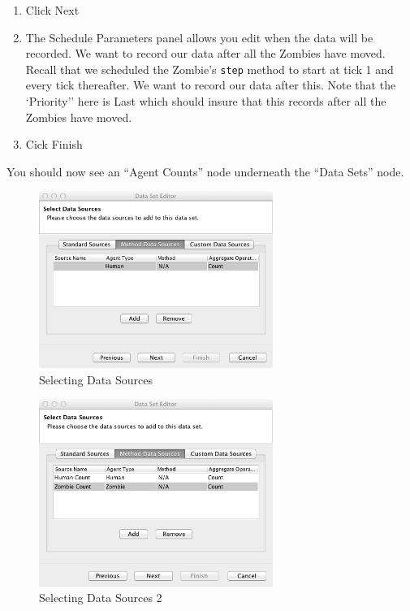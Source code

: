 \documentclass[11pt]{amsart}
\begin{document}
\begin{enumerate}
\item Click Next
\item The Schedule Parameters panel allows you edit when the data will be recorded. We want to record our data after all the Zombies have moved. Recall that we scheduled the Zombie's \texttt{step} method to start at tick 1 and every tick thereafter. We want to record our data after this. Note that the `Priority'' here is Last which should insure that this records after all the Zombies have moved.
\item Cick Finish
\end{enumerate}
\vspace{.2in}

You should now see an ``Agent Counts'' node underneath the ``Data Sets'' node. \\

\begin{figure}[h]
\begin{center}
\vspace{.2in}
\centerline {
\includegraphics[width=3in]{GettingStartedImages/data1.png}
}
\caption{Selecting Data Sources}
\label{fig:data1}
\end{center}
\end{figure}

\begin{figure}[h]
\begin{center}
\vspace{.2in}
\centerline {
\includegraphics[width=3in]{GettingStartedImages/data2.png}
}
\caption{Selecting Data Sources 2}
\label{fig:data2}
\end{center}
\end{figure}
\end{document}
